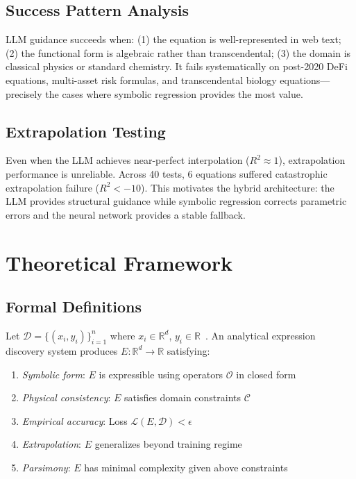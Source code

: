 \documentclass[twoside,11pt]{article}
\newcommand{\Rsq}{R^{2}}
\begin{document}
\subsection{Success Pattern Analysis}\label{subsec:success-pattern-analysis}
\label{sec:llm_success}

LLM guidance succeeds when: (1) the equation is well-represented in web text; (2) the functional form is algebraic rather than transcendental; (3) the domain is classical physics or standard chemistry. It fails systematically on post-2020 DeFi equations, multi-asset risk formulas, and transcendental biology equations---precisely the cases where symbolic regression provides the most value.

\subsection{Extrapolation Testing}\label{subsec:extrapolation-testing}
\label{sec:llm_extrap}

Even when the LLM achieves near-perfect interpolation ($\Rsq \approx 1$), extrapolation performance is unreliable. Across 40 tests, 6 equations suffered catastrophic extrapolation failure ($\Rsq < -10$). This motivates the hybrid architecture: the LLM provides structural guidance while symbolic regression corrects parametric errors and the neural network provides a stable fallback.

\section{Theoretical Framework}
\label{sec:theory}

\subsection{Formal Definitions}\label{subsec:formal-definitions}
\label{sec:theory_defs}

\begin{definition}
Let $\mathcal{D} = \{(x_i, y_i)\}_{i=1}^n$ where $x_i \in \mathbb{R}^d$, $y_i \in \mathbb{R}$~\citep{udrescu2020ai}. An analytical expression discovery system produces $E: \mathbb{R}^d \to \mathbb{R}$ satisfying:
\begin{enumerate}
  \item \textit{Symbolic form}: $E$ is expressible using operators $\mathcal{O}$ in closed form
  \item \textit{Physical consistency}: $E$ satisfies domain constraints $\mathcal{C}$
  \item \textit{Empirical accuracy}: Loss $\mathcal{L}(E, \mathcal{D}) < \epsilon$
  \item \textit{Extrapolation}: $E$ generalizes beyond training regime
  \item \textit{Parsimony}: $E$ has minimal complexity given above constraints
\end{enumerate}
\end{definition}
\end{document}
